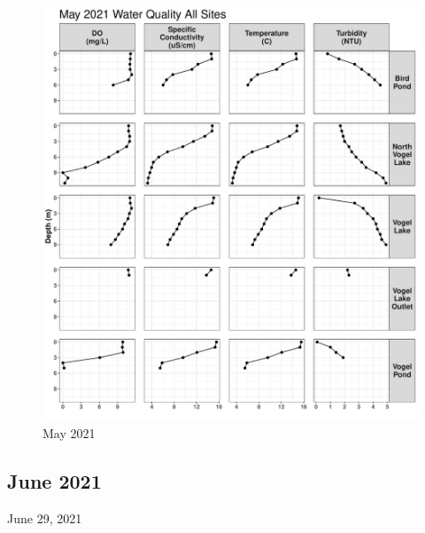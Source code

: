 \documentclass[
]{book}
\begin{document}
\begin{figure}
\centering
\includegraphics{Miller_Creek_Vogel_Lake_Water_Quality_files/figure-latex/unnamed-chunk-6-1.pdf}
\caption{\label{fig:unnamed-chunk-6}May 2021}
\end{figure}

\hypertarget{june-2021}{%
\subsection{June 2021}\label{june-2021}}

June 29, 2021
\end{document}
